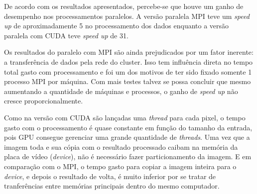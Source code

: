 \newpage
De acordo com os resultados apresentados, percebe-se que houve um ganho de desempenho nos processamentos paralelos. A versão paralela MPI teve um \textit{speed up} de aproximadamente 5 no processamento dos dados enquanto a versão paralela com CUDA teve \textit{speed up} de 31.

Os resultados do paralelo com MPI são ainda prejudicados por um fator inerente: a transferência de dados pela rede do cluster. Isso tem influência direta no tempo total gasto com processamento e foi um dos motivos de ter sido fixado somente 1 processo MPI por máquina. Com mais testes talvez se possa concluir que mesmo aumentando a quantidade de máquinas e processos, o ganho de \textit{speed up} não cresce proporcionalmente.

Como na versão com CUDA são lançadas uma \textit{thread} para cada pixel, o tempo gasto com o processamento é quase constante em função do tamanho da entrada, pois GPU consegue gerenciar uma grande quantidade de \textit{threads}. Uma vez que a imagem toda e sua cópia com o resultado processado caibam na memória da placa de vídeo (\textit{device}), não é necessário fazer particionamento da imagem. E em comparação com o MPI, o tempo gasto para copiar a imagem inteira para o \textit{device}, e depois o resultado de volta, é muito inferior por se tratar de tranferências entre memórias principais dentro do mesmo computador.

